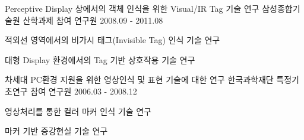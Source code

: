 \begin{cventries}
  \cventry
    {Perceptive Display 상에서의 객체 인식을 위한 Visual/IR Tag 기술 연구} %
    {삼성종합기술원 산학과제} %
    {참여 연구원} %
    {2008.09 - 2011.08} %
    {
      \begin{cvitems} %
        \item {적외선 영역에서의 비가시 태그(Invisible Tag) 인식 기술 연구}
        \item {대형 Display 환경에서의 Tag 기반 상호작용 기술 연구}
      \end{cvitems}
    }

  \cventry
    {차세대 PC환경 지원을 위한 영상인식 및 표현 기술에 대한 연구} %
    {한국과학재단 특정기초연구} %
    {참여 연구원} %
    {2006.03 - 2008.12} %
    {
      \begin{cvitems} %
        \item {영상처리를 통한 컬러 마커 인식 기술 연구}
        \item {마커 기반 증강현실 기술 연구}
      \end{cvitems}
    }
\end{cventries}
